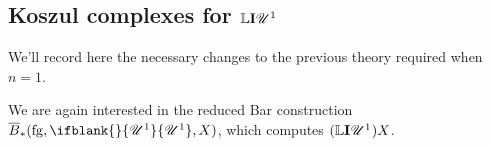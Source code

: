 \documentclass[11pt]{article}
\makeatletter
\newcommand{\LL}[1]{{\scrK}^{#1}}%
\newcommand{\nontop}[1]{\scrU^{#1}}%
\newcommand{\produces}[3]{{#1}{#3}{#2}}
\newcommand{\Ind}[2][]{\mathbf{I}{#2}_{#1}}%
\newcommand{\forget}{\mathrm{fg}}
\newcommand{\Fr}[2][]{\ifblank{#1}{#2}{#2_{#1}}}
\newcommand{\derived}{\mathbb{L}}
\newcommand{\minDimP}{\overline{m}}
\renewcommand{\produces}[3]{
{
\def\labelstyle{\scriptstyle}
\xymatrix@C=2em@1{
{#1}
\ar@{-}[r]|-{{\,#3\,}}
&%
{#2}%
}}}
\makeatother
\begin{document}
\begin{KoszulComplexes1}
\subsection{Koszul complexes for $\derived\Ind{\nontop{1}}$}
We'll record here the necessary changes to the previous theory required when $n=1$.


We are again interested in the reduced Bar construction $\overline{B}_*(\forget,\Fr{\nontop{1}},X)$, which computes $(\derived\Ind{\nontop{1}})X$.



\end{KoszulComplexes1}
\end{document}
